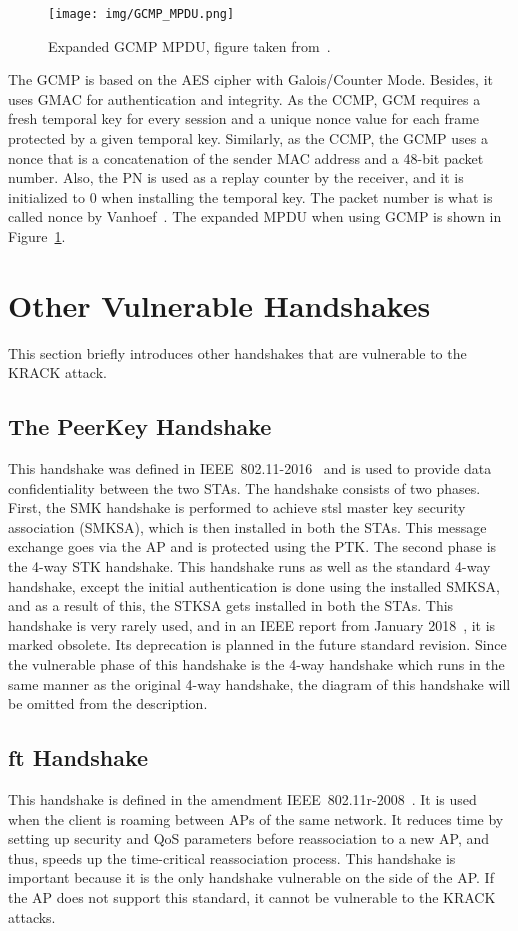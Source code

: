 \begin{figure}[h!]
  \centering
  \texttt{[image: img/GCMP\_MPDU.png]}
  \caption[Expanded GCMP MPDU]{Expanded GCMP MPDU, figure taken from~\cite{IEEE802_11ad}.}
  \label{fig: GCMP_MPDU}
\end{figure}

The GCMP is based on the AES cipher with Galois/Counter Mode. Besides, it uses GMAC for authentication and integrity. As the CCMP, GCM requires a fresh temporal key for every session and a unique nonce value for each frame protected by a given temporal key. Similarly, as the CCMP, the GCMP uses a nonce that is a concatenation of the sender MAC address and a 48-bit packet number. Also, the PN is used as a replay counter by the receiver, and it is initialized to 0 when installing the temporal key. The packet number is what is called nonce by Vanhoef~\cite{VA_ccs2017}. The expanded MPDU when using GCMP is shown in Figure~\ref{fig: GCMP_MPDU}.

\section{Other Vulnerable Handshakes}
This section briefly introduces other handshakes that are vulnerable to the KRACK attack.

\subsection{The PeerKey Handshake}
This handshake was defined in IEEE~802.11-2016~\cite{revision2016} and is used to provide data confidentiality between the two STAs. The handshake consists of two phases. First, the SMK handshake is performed to achieve \gls{stsl} master key security association (SMKSA), which is then installed in both the STAs. This message exchange goes via the AP and is protected using the PTK. The second phase is the 4-way STK handshake. This handshake runs as well as the standard 4-way handshake, except the initial authentication is done using the installed SMKSA, and as a result of this, the STKSA gets installed in both the STAs. This handshake is very rarely used, and in an IEEE report from January 2018~\cite{IEEEP802.11}, it is marked obsolete. Its deprecation is planned in the future standard revision. Since the vulnerable phase of this handshake is the 4-way handshake which runs in the same manner as the original 4-way handshake, the diagram of this handshake will be omitted from the description. 

\subsection{\gls{ft} Handshake}
This handshake is defined in the amendment IEEE~802.11r-2008~\cite{ieee802.11r_2008}. It is used when the client is roaming between APs of the same network. It reduces time by setting up security and QoS parameters before reassociation to a new AP, and thus, speeds up the time-critical reassociation process. This handshake is important because it is the only handshake vulnerable on the side of the AP. If the AP does not support this standard, it cannot be vulnerable to the KRACK attacks. 

